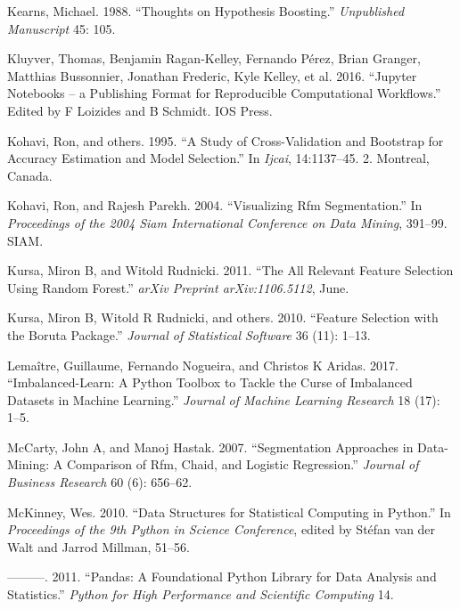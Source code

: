 \documentclass[
  11pt,
  a4paper,
  DIV=12,captions=tableheading,oneside,titlepage]{scrbook}
\begin{document}
\leavevmode\hypertarget{ref-kearns1988thoughts}{}%
Kearns, Michael. 1988. ``Thoughts on Hypothesis Boosting.'' \emph{Unpublished Manuscript} 45: 105.

\leavevmode\hypertarget{ref-Kluyver:2016aa}{}%
Kluyver, Thomas, Benjamin Ragan-Kelley, Fernando Pérez, Brian Granger, Matthias Bussonnier, Jonathan Frederic, Kyle Kelley, et al. 2016. ``Jupyter Notebooks -- a Publishing Format for Reproducible Computational Workflows.'' Edited by F Loizides and B Schmidt. IOS Press.

\leavevmode\hypertarget{ref-kohavi1995study}{}%
Kohavi, Ron, and others. 1995. ``A Study of Cross-Validation and Bootstrap for Accuracy Estimation and Model Selection.'' In \emph{Ijcai}, 14:1137--45. 2. Montreal, Canada.

\leavevmode\hypertarget{ref-kohavi2004visualizing}{}%
Kohavi, Ron, and Rajesh Parekh. 2004. ``Visualizing Rfm Segmentation.'' In \emph{Proceedings of the 2004 Siam International Conference on Data Mining}, 391--99. SIAM.

\leavevmode\hypertarget{ref-kursa2011boruta}{}%
Kursa, Miron B, and Witold Rudnicki. 2011. ``The All Relevant Feature Selection Using Random Forest.'' \emph{arXiv Preprint arXiv:1106.5112}, June.

\leavevmode\hypertarget{ref-kursa2010boruta}{}%
Kursa, Miron B, Witold R Rudnicki, and others. 2010. ``Feature Selection with the Boruta Package.'' \emph{Journal of Statistical Software} 36 (11): 1--13.

\leavevmode\hypertarget{ref-lemaitre2017imblearn}{}%
Lemaître, Guillaume, Fernando Nogueira, and Christos K Aridas. 2017. ``Imbalanced-Learn: A Python Toolbox to Tackle the Curse of Imbalanced Datasets in Machine Learning.'' \emph{Journal of Machine Learning Research} 18 (17): 1--5.

\leavevmode\hypertarget{ref-MCCARTY2007656}{}%
McCarty, John A, and Manoj Hastak. 2007. ``Segmentation Approaches in Data-Mining: A Comparison of Rfm, Chaid, and Logistic Regression.'' \emph{Journal of Business Research} 60 (6): 656--62.

\leavevmode\hypertarget{ref-mckinney-proc-scipy-2010}{}%
McKinney, Wes. 2010. ``Data Structures for Statistical Computing in Python.'' In \emph{Proceedings of the 9th Python in Science Conference}, edited by Stéfan van der Walt and Jarrod Millman, 51--56.

\leavevmode\hypertarget{ref-mckinney2011pandas}{}%
---------. 2011. ``Pandas: A Foundational Python Library for Data Analysis and Statistics.'' \emph{Python for High Performance and Scientific Computing} 14.
\end{document}
